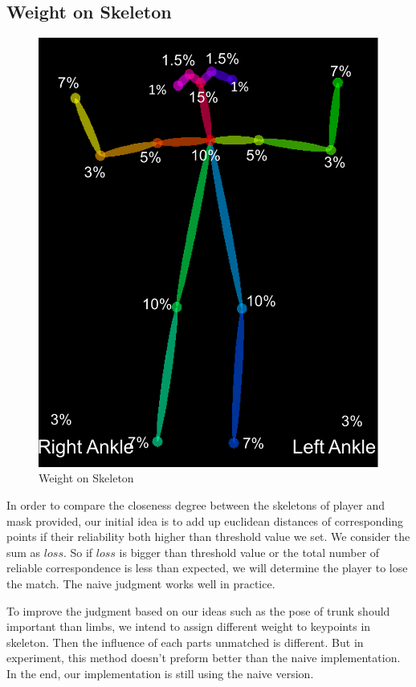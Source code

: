 \documentclass[11pt,twocolumn,letterpaper]{article}
\begin{document}
	\subsection{Weight on Skeleton}
      \begin{figure}[h]
      \centering
      \includegraphics[width=0.8\linewidth]{./Pic/skeleton}
      \caption{Weight on Skeleton}
      \end{figure}

      \par In order to compare the closeness degree between the skeletons of player and mask provided, our initial idea is to add up euclidean distances of corresponding points if their reliability both higher than threshold value we set. We consider the sum as $loss$. So if $loss$ is bigger than threshold value or the total number of reliable correspondence is less than expected, we will determine the player to lose the match. The naive judgment works well in practice.
      \par To improve the judgment based on our ideas such as the pose of trunk should important than limbs, we intend to assign different weight to keypoints in skeleton. Then the influence of each parts unmatched is different. But in experiment, this method doesn't preform better than the naive implementation. In the end, our implementation is still using the naive version.
\end{document}
